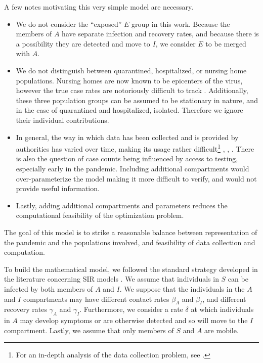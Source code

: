 \documentclass[11pt]{article}
\begin{document}
		A few notes motivating this very simple model are necessary.
		\begin{itemize}
			\item
				We do not consider the ``exposed'' $E$ group in this work.
				Because the members of $A$ have separate infection and recovery rates, and because there is a possibility they are detected and move to $I$, we consider $E$ to be merged with $A$.
			\item
				We do not distinguish between quarantined, hospitalized, or nursing home populations.
				Nursing homes are now known to be epicenters of the virus, however the true case rates are notoriously difficult to track \cite{nursing-homes}.
				Additionally, these three population groups can be assumed to be stationary in nature, and in the case of quarantined and hospitalized, isolated.
				Therefore we ignore their individual contributions.
			\item
				In general, the way in which data has been collected and is provided by authorities has varied over time, making its usage rather difficult\footnote{For an in-depth analysis of the data collection problem, see \cite{sara-soremo}.} \cite{messy-data1}, \cite{messy-data2}, \cite{challenges}.
				There is also the question of case counts being influenced by access to testing, especially early in the pandemic.
				Including additional compartments would over-parameterize the model making it more difficult to verify, and would not provide useful information.
			\item
				Lastly, adding additional compartments and parameters reduces the computational feasibility of the optimization problem.
		\end{itemize}
		The goal of this model is to strike a reasonable balance between representation of the pandemic and the populations involved, and feasibility of data collection and computation.
	
		To build the mathematical model, we followed the standard strategy developed in the literature concerning SIR models \cite{bio-models}.
		We assume that individuals in $S$ can be infected by both members of $A$ and $I$.
		We suppose that the individuals in the $A$ and $I$ compartments may have different contact rates $\beta_A$ and $\beta_I$, and different recovery rates $\gamma_A$ and $\gamma_I$.
		Furthermore, we consider a rate $\delta$ at which individuals in $A$ may develop symptoms or are otherwise detected and so will move to the $I$ compartment.
		Lastly, we assume that only members of $S$ and $A$ are mobile.
		
\end{document}
